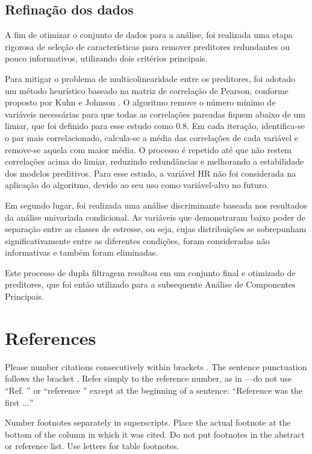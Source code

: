 \documentclass[conference]{IEEEtran}
\begin{document}
\subsection{Refinação dos dados}
A fim de otimizar o conjunto de dados para a análise, foi realizada uma etapa rigorosa de seleção de características para remover preditores redundantes ou pouco informativos, utilizando dois critérios principais.

Para mitigar o problema de multicolinearidade entre os preditores, foi adotado um método heurístico baseado na matriz de correlação de Pearson, conforme proposto por Kuhn e Johnson \cite{b8}. O algoritmo remove o número mínimo de variáveis necessárias para que todas as correlações pareadas fiquem abaixo de um limiar, que foi definido para esse estudo como $0.8$. Em cada iteração, identifica-se o par mais correlacionado, calcula-se a média das correlações de cada variável e remove-se aquela com maior média. O processo é repetido até que não restem correlações acima do limiar, reduzindo redundâncias e melhorando a estabilidade dos modelos preditivos. Para esse estudo, a variável HR não foi considerada na aplicação do algoritmo, devido ao seu uso como variável-alvo no futuro.

Em segundo lugar, foi realizada uma análise discriminante baseada nos resultados da análise univariada condicional. As variáveis que demonstraram baixo poder de separação entre as classes de estresse, ou seja, cujas distribuições se sobrepunham significativamente entre as diferentes condições, foram consideradas não informativas e também foram eliminadas.

Este processo de dupla filtragem resultou em um conjunto final e otimizado de preditores, que foi então utilizado para a subsequente Análise de Componentes Principais.


\section*{References}

Please number citations consecutively within brackets \cite{b1}. The 
sentence punctuation follows the bracket \cite{b2}. Refer simply to the reference 
number, as in \cite{b3}---do not use ``Ref. \cite{b3}'' or ``reference \cite{b3}'' except at 
the beginning of a sentence: ``Reference \cite{b3} was the first $\ldots$''

Number footnotes separately in superscripts. Place the actual footnote at 
the bottom of the column in which it was cited. Do not put footnotes in the 
abstract or reference list. Use letters for table footnotes.
\end{document}
